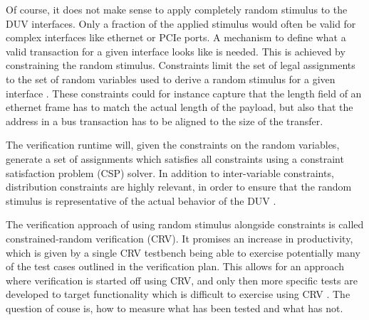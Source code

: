 \documentclass[11pt]{report}
\begin{document}
Of course, it does not make sense to apply completely random stimulus to the DUV interfaces. Only a fraction of the
applied stimulus would often be valid for complex interfaces like ethernet or PCIe ports. A mechanism to define what
a valid transaction for a given interface looks like is needed. This is achieved by constraining the random stimulus.
Constraints limit the set of legal assignments to the set of random variables used to derive a random stimulus for a
given interface \cite[Ch. 3]{bergeron2012writing}. These constraints could for instance capture that the length field
of an ethernet frame has to match the actual length of the payload, but also that the address in a bus transaction
has to be aligned to the size of the transfer.

The verification runtime will, given the constraints on the random variables, generate a set of assignments which
satisfies all constraints using a constraint satisfaction problem (CSP) solver. In addition to inter-variable
constraints, distribution constraints are highly relevant,
in order to ensure that the random stimulus is representative of the actual behavior of the DUV \cite[Sec. 7.5]{flake2020a}.

The verification approach of using random stimulus alongside constraints is called constrained-random verification
(CRV). It promises an increase in productivity, which is given by a single CRV testbench being able to exercise
potentially many of the test cases outlined in the verification plan. This allows for an approach where verification
is started off using CRV, and only then more specific tests are developed to target functionality which is difficult
to exercise using CRV \cite[Ch. 3]{bergeron2012writing}. The question of couse is, how to measure what has been
tested and what has not.

\begin{comment}

start of with CRV and then add specific tests with constrains for uncovered features \cite[Ch. 3]{bergeron2012writing}

by exercising many of
these features with a single, very long stream of random stimulus . If the stimulus
generator is properly constrained to produce valid transaction patterns, it may not only produce the test cases
captured in the verification plan, but may even lead to conditions not considered in the verification plan, like some
hard-to-trigger edge cases \cite[Ch. 3]{bergeron2012writing}.

\cite[Ch. 13]{mehta2021introduction}

- idea is quite simple
- but achieving actually exhaustive random stimulus can be difficult

\end{comment}
\end{document}

